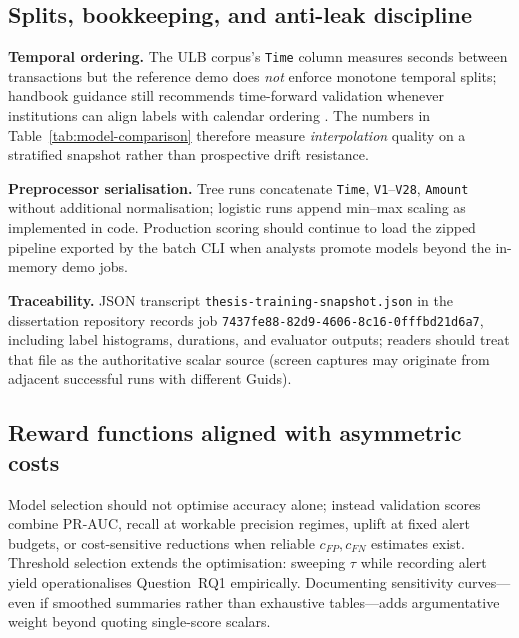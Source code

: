 \subsection{Splits, bookkeeping, and anti-leak discipline}
\textbf{Temporal ordering.} The ULB corpus's \texttt{Time} column measures seconds between transactions but the reference demo does \emph{not} enforce monotone temporal splits; handbook guidance still recommends time-forward validation whenever institutions can align labels with calendar ordering \cite{fraud_handbook}. The numbers in Table~\ref{tab:model-comparison} therefore measure \emph{interpolation} quality on a stratified snapshot rather than prospective drift resistance.

\textbf{Preprocessor serialisation.} Tree runs concatenate \texttt{Time}, \texttt{V1}--\texttt{V28}, \texttt{Amount} without additional normalisation; logistic runs append min--max scaling as implemented in code. Production scoring should continue to load the zipped pipeline exported by the batch CLI when analysts promote models beyond the in-memory demo jobs.

\textbf{Traceability.} JSON transcript \texttt{thesis-training-snapshot.json} in the dissertation repository records job \texttt{7437fe88-82d9-4606-8c16-0fffbd21d6a7}, including label histograms, durations, and evaluator outputs; readers should treat that file as the authoritative scalar source (screen captures may originate from adjacent successful runs with different Guids).

\subsection{Reward functions aligned with asymmetric costs}
Model selection should not optimise accuracy alone; instead validation scores combine PR-AUC, recall at workable precision regimes, uplift at fixed alert budgets, or cost-sensitive reductions when reliable $c_{FP},c_{FN}$ estimates exist. Threshold selection extends the optimisation: sweeping $\tau$ while recording alert yield operationalises Question~RQ1 empirically. Documenting sensitivity curves—even if smoothed summaries rather than exhaustive tables—adds argumentative weight beyond quoting single-score scalars.

